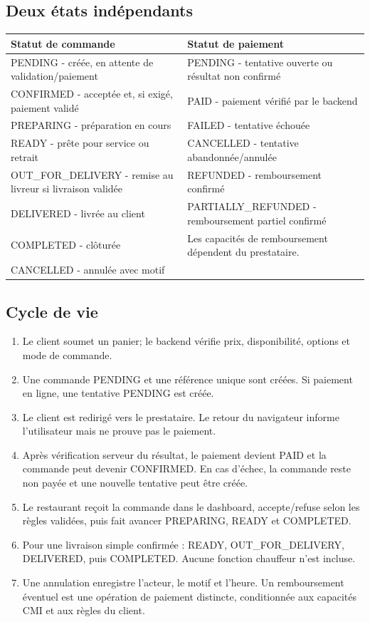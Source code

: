 \documentclass[10pt,a4paper]{article}
\begin{document}
\subsection{Deux états indépendants}
\begin{tabularx}{\linewidth}{@{}L{7.6cm}Y@{}}
\toprule
\textbf{Statut de commande} & \textbf{Statut de paiement} \\
\midrule
PENDING - créée, en attente de validation/paiement & PENDING - tentative ouverte ou résultat non confirmé \\
CONFIRMED - acceptée et, si exigé, paiement validé & PAID - paiement vérifié par le backend \\
PREPARING - préparation en cours & FAILED - tentative échouée \\
READY - prête pour service ou retrait & CANCELLED - tentative abandonnée/annulée \\
OUT\_FOR\_DELIVERY - remise au livreur si livraison validée & REFUNDED - remboursement confirmé \\
DELIVERED - livrée au client & PARTIALLY\_REFUNDED - remboursement partiel confirmé \\
COMPLETED - clôturée & Les capacités de remboursement dépendent du prestataire. \\
CANCELLED - annulée avec motif & \\
\bottomrule
\end{tabularx}

\subsection{Cycle de vie}
\begin{enumerate}
  \item Le client soumet un panier; le backend vérifie prix, disponibilité, options et mode de commande.
  \item Une commande PENDING et une référence unique sont créées. Si paiement en ligne, une tentative PENDING est créée.
  \item Le client est redirigé vers le prestataire. Le retour du navigateur informe l'utilisateur mais ne prouve pas le paiement.
  \item Après vérification serveur du résultat, le paiement devient PAID et la commande peut devenir CONFIRMED. En cas d'échec, la commande reste non payée et une nouvelle tentative peut être créée.
  \item Le restaurant reçoit la commande dans le dashboard, accepte/refuse selon les règles validées, puis fait avancer PREPARING, READY et COMPLETED.
  \item Pour une livraison simple confirmée : READY, OUT\_FOR\_DELIVERY, DELIVERED, puis COMPLETED. Aucune fonction chauffeur n'est incluse.
  \item Une annulation enregistre l'acteur, le motif et l'heure. Un remboursement éventuel est une opération de paiement distincte, conditionnée aux capacités CMI et aux règles du client.
\end{enumerate}
\end{document}
